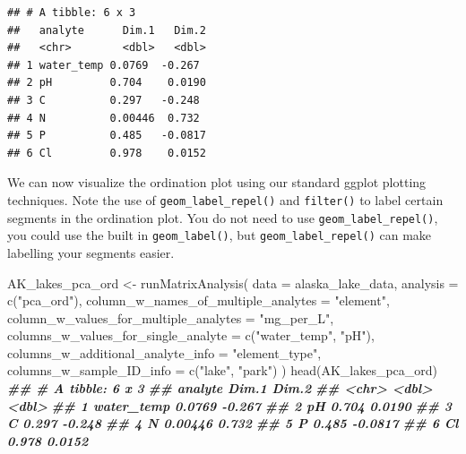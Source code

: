 \documentclass[
]{krantz}
\newenvironment{Shaded}{\begin{snugshade}}{\end{snugshade}}
\newcommand{\AttributeTok}[1]{\textcolor[rgb]{0.77,0.63,0.00}{#1}}
\newcommand{\DocumentationTok}[1]{\textcolor[rgb]{0.56,0.35,0.01}{\textbf{\textit{#1}}}}
\newcommand{\FunctionTok}[1]{\textcolor[rgb]{0.00,0.00,0.00}{#1}}
\newcommand{\NormalTok}[1]{#1}
\newcommand{\OtherTok}[1]{\textcolor[rgb]{0.56,0.35,0.01}{#1}}
\newcommand{\StringTok}[1]{\textcolor[rgb]{0.31,0.60,0.02}{#1}}
\begin{document}
\begin{verbatim}
## # A tibble: 6 x 3
##   analyte      Dim.1   Dim.2
##   <chr>        <dbl>   <dbl>
## 1 water_temp 0.0769  -0.267 
## 2 pH         0.704    0.0190
## 3 C          0.297   -0.248 
## 4 N          0.00446  0.732 
## 5 P          0.485   -0.0817
## 6 Cl         0.978    0.0152
\end{verbatim}

We can now visualize the ordination plot using our standard ggplot plotting techniques. Note the use of \texttt{geom\_label\_repel()} and \texttt{filter()} to label certain segments in the ordination plot. You do not need to use \texttt{geom\_label\_repel()}, you could use the built in \texttt{geom\_label()}, but \texttt{geom\_label\_repel()} can make labelling your segments easier.

\begin{Shaded}
\begin{Highlighting}[]
\NormalTok{AK\_lakes\_pca\_ord }\OtherTok{\textless{}{-}} \FunctionTok{runMatrixAnalysis}\NormalTok{(}
  \AttributeTok{data =}\NormalTok{ alaska\_lake\_data,}
  \AttributeTok{analysis =} \FunctionTok{c}\NormalTok{(}\StringTok{"pca\_ord"}\NormalTok{),}
  \AttributeTok{column\_w\_names\_of\_multiple\_analytes =} \StringTok{"element"}\NormalTok{,}
  \AttributeTok{column\_w\_values\_for\_multiple\_analytes =} \StringTok{"mg\_per\_L"}\NormalTok{,}
  \AttributeTok{columns\_w\_values\_for\_single\_analyte =} \FunctionTok{c}\NormalTok{(}\StringTok{"water\_temp"}\NormalTok{, }\StringTok{"pH"}\NormalTok{),}
  \AttributeTok{columns\_w\_additional\_analyte\_info =} \StringTok{"element\_type"}\NormalTok{,}
  \AttributeTok{columns\_w\_sample\_ID\_info =} \FunctionTok{c}\NormalTok{(}\StringTok{"lake"}\NormalTok{, }\StringTok{"park"}\NormalTok{)}
\NormalTok{)}
\FunctionTok{head}\NormalTok{(AK\_lakes\_pca\_ord)}
\DocumentationTok{\#\# \# A tibble: 6 x 3}
\DocumentationTok{\#\#   analyte      Dim.1   Dim.2}
\DocumentationTok{\#\#   \textless{}chr\textgreater{}        \textless{}dbl\textgreater{}   \textless{}dbl\textgreater{}}
\DocumentationTok{\#\# 1 water\_temp 0.0769  {-}0.267 }
\DocumentationTok{\#\# 2 pH         0.704    0.0190}
\DocumentationTok{\#\# 3 C          0.297   {-}0.248 }
\DocumentationTok{\#\# 4 N          0.00446  0.732 }
\DocumentationTok{\#\# 5 P          0.485   {-}0.0817}
\DocumentationTok{\#\# 6 Cl         0.978    0.0152}


\end{Highlighting}
\end{Shaded}
\end{document}

